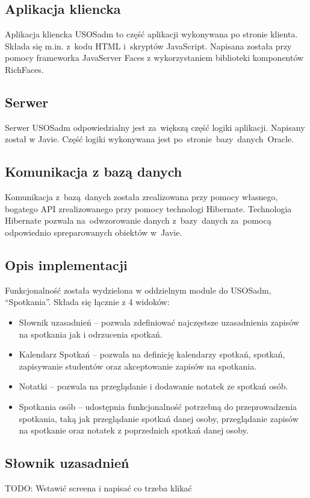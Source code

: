 \documentclass[licencjacka]{pracamgr}
\begin{document}
\subsection{Aplikacja kliencka}
Aplikacja kliencka USOSadm to część aplikacji wykonywana po stronie klienta. Składa się m.in. z~kodu HTML i~skryptów JavaScript. Napisana została przy pomocy frameworka JavaServer Faces z wykorzystaniem biblioteki komponentów RichFaces.

\subsection{Serwer}
Serwer USOSadm odpowiedzialny jest za~większą część logiki aplikacji. Napisany został w Javie. Część logiki wykonywana jest po~stronie~bazy~danych~Oracle.

\subsection{Komunikacja z bazą danych}
Komunikacja z~bazą~danych została zrealizowana przy pomocy własnego, bogatego API zrealizowanego przy pomocy technologi Hibernate. Technologia Hibernate pozwala na~odwzorowanie danych z~bazy~danych za~pomocą odpowiednio spreparowanych obiektów w~Javie.

\subsection{Opis implementacji}
Funkcjonalność została wydzielona w oddzielnym module do USOSadm, \enquote{Spotkania}. Składa się łącznie z 4 widoków:
\begin{itemize}
\item Słownik uzasadnień -- pozwala zdefiniować najczęstsze uzasadnienia zapisów na spotkania jak i odrzucenia spotkań.
\item Kalendarz Spotkań -- pozwala na definicję kalendarzy spotkań, spotkań, zapisywanie studentów oraz akceptowanie zapisów na spotkania.
\item Notatki -- pozwala na przeglądanie i dodawanie notatek ze spotkań osób.
\item Spotkania osób -- udostępnia funkcjonalność potrzebną do przeprowadzenia spotkania, taką jak przeglądanie spotkań danej osoby, przeglądanie zapisów na spotkanie oraz notatek z poprzednich spotkań danej osoby.
\end{itemize}

\subsection{Słownik uzasadnień}
TODO: Wstawić screena i napisać co trzeba klikać
\end{document}
